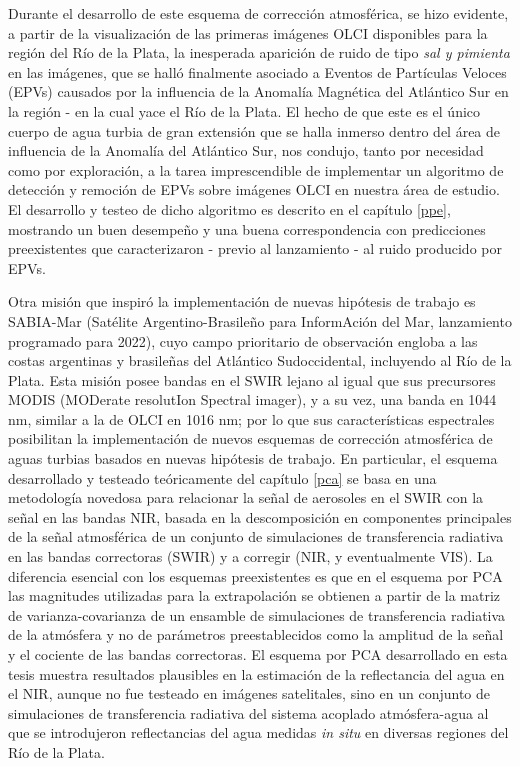 Durante el desarrollo de este esquema de corrección atmosférica, se hizo evidente, a partir de la visualización de las primeras imágenes OLCI disponibles para la región del Río de la Plata, la inesperada aparición de ruido de tipo \textit{sal y pimienta} en las imágenes, que se halló finalmente asociado a Eventos de Partículas Veloces (EPVs) causados por la influencia de la Anomalía Magnética del Atlántico Sur en la región - en la cual yace el Río de la Plata. El hecho de que este es el único cuerpo de agua turbia de gran extensión que se halla inmerso dentro del área de influencia de la Anomalía del Atlántico Sur, nos condujo, tanto por necesidad como por exploración, a la tarea imprescendible de implementar un algoritmo de detección y remoción de EPVs sobre imágenes OLCI en nuestra área de estudio. El desarrollo y testeo de dicho algoritmo es descrito en el capítulo \ref{ppe}, mostrando un buen desempeño y una buena correspondencia con predicciones preexistentes que caracterizaron - previo al lanzamiento - al ruido producido por EPVs.

Otra misión que inspiró la implementación de nuevas hipótesis de trabajo es SABIA-Mar (Satélite Argentino-Brasileño para InformAción del Mar, lanzamiento programado para 2022), cuyo campo prioritario de observación engloba a las costas argentinas y brasileñas del Atlántico Sudoccidental, incluyendo al Río de la Plata. Esta misión posee bandas en el SWIR lejano al igual que sus precursores MODIS (MODerate resolutIon Spectral imager), y a su vez, una banda en 1044 nm, similar a la de OLCI en 1016 nm; por lo que sus características espectrales posibilitan la implementación de nuevos esquemas de corrección atmosférica de aguas turbias basados en nuevas hipótesis de trabajo. En particular, el esquema desarrollado y testeado teóricamente del capítulo \ref{pca} se basa en una metodología novedosa para relacionar la señal de aerosoles en el SWIR con la señal en las bandas NIR, basada en la descomposición en componentes principales de la señal atmosférica de un conjunto de simulaciones de transferencia radiativa en las bandas correctoras (SWIR) y a corregir (NIR, y eventualmente VIS). La diferencia esencial con los esquemas preexistentes es que en el esquema por PCA las magnitudes utilizadas para la extrapolación se obtienen a partir de la matriz de varianza-covarianza de un ensamble de simulaciones de transferencia radiativa de la atmósfera y no de parámetros preestablecidos como la amplitud de la señal y el cociente de las bandas correctoras. El esquema por PCA desarrollado en esta tesis muestra resultados plausibles en la estimación de la reflectancia del agua en el NIR, aunque no fue testeado en imágenes satelitales, sino en un conjunto de simulaciones de transferencia radiativa del sistema acoplado atmósfera-agua al que se introdujeron reflectancias del agua medidas \textit{in situ} en diversas regiones del Río de la Plata.

